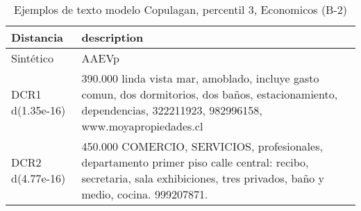 \begin{table}[H]
\centering
\fontsize{10}{14}\selectfont
\caption{Ejemplos de texto modelo Copulagan, percentil 3, Economicos (B-2)}
\label{table-example-economicos-b-2-copulagan-3p-text}
\begin{tabular}{|l|m{35em}|}
\hline
\rowcolor[gray]{0.8}
Distancia & description \\
\hline Sintético & AAEVp \\
\hline DCR1 d(1.35e-16) & 390.000 linda vista mar, amoblado, incluye gasto comun, dos dormitorios, dos ba\~nos, estacionamiento, dependencias, 322211923, 982996158, www.moyapropiedades.cl \\
\hline DCR2 d(4.77e-16) & 450.000 COMERCIO, SERVICIOS, profesionales, departamento primer piso calle central: recibo, secretaria, sala exhibiciones, tres privados, ba\~no y medio, cocina. 999207871. \\
\hline
\end{tabular}
\end{table}
